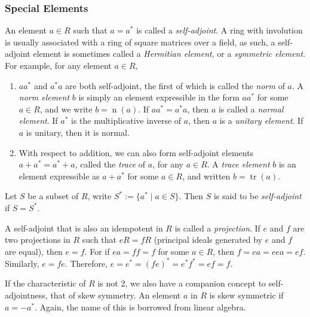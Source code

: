 \documentclass[12pt]{article}
\begin{document}
\subsubsection*{Special Elements}  An element $a\in R$ such that $a=a^*$ is called a \emph{self-adjoint}.  A ring with involution is usually associated with a ring of square matrices over a field, as such, a self-adjoint element is sometimes called a \emph{Hermitian element}, or a \emph{symmetric element}.  For example, for any element $a\in R$, 

\begin{enumerate}
\item $aa^*$ and $a^*a$ are both self-adjoint, the first of which is called the \emph{norm} of $a$.  A \emph{norm element} $b$ is simply an element expressible in the form $aa^*$ for some $a\in R$, and we write $b=\operatorname{n}(a)$.  If $aa^*=a^*a$, then $a$ is called a \emph{normal element}.  If $a^*$ is the multiplicative inverse of $a$, then $a$ is a \emph{unitary element}.  If $a$ is unitary, then it is normal.
\item With respect to addition, we can also form self-adjoint elements $a+a^*=a^*+a$, called the \emph{trace} of $a$, for any $a\in R$.  A \emph{trace element} $b$ is an element expressible as $a+a^*$ for some $a\in R$, and written $b=\operatorname{tr}(a)$.
\end{enumerate}

Let $S$ be a subset of $R$, write $S^*:=\lbrace a^*\mid a\in S\rbrace$.  Then $S$ is said to be \emph{self-adjoint} if $S=S^*$.  

A self-adjoint that is also an idempotent in $R$ is called a \emph{projection}.  If $e$ and $f$ are two projections in $R$ such that $eR=fR$ (principal ideals generated by $e$ and $f$ are equal), then $e=f$.  For if $ea=ff=f$ for some $a\in R$, then $f=ea=eea=ef$.  Similarly, $e=fe$.  Therefore, $e=e^*=(fe)^*=e^*f^*=ef=f$.

If the characteristic of $R$ is not 2, we also have a companion concept to self-adjointness, that of skew symmetry.  An element $a$ in $R$ is skew symmetric if $a=-a^*$.  Again, the name of this is borrowed from linear algebra.
\end{document}
